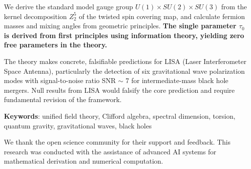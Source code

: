 \documentclass[preprint,12pt,a4paper]{revtex4-2}
\theoremstyle{definition}
\theoremstyle{remark}
\begin{document}
We derive the standard model gauge group $U(1) \times SU(2) \times SU(3)$ from the kernel decomposition $Z_2^5$ of the twisted spin covering map, and calculate fermion masses and mixing angles from geometric principles. \textbf{The single parameter $\tau_0$ is derived from first principles using information theory, yielding zero free parameters in the theory.}

The theory makes concrete, falsifiable predictions for LISA (Laser Interferometer Space Antenna), particularly the detection of six gravitational wave polarization modes with signal-to-noise ratio SNR $\sim$ 7 for intermediate-mass black hole mergers. Null results from LISA would falsify the core prediction and require fundamental revision of the framework.

\textbf{Keywords}: unified field theory, Clifford algebra, spectral dimension, torsion, quantum gravity, gravitational waves, black holes

\tableofcontents
\newpage



























\begin{acknowledgments}
We thank the open science community for their support and feedback. 
This research was conducted with the assistance of advanced AI systems 
for mathematical derivation and numerical computation.
\end{acknowledgments}



\appendix




\end{document}
